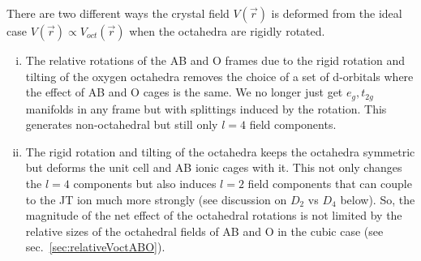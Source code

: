 \documentclass[a4paper,prb]{revtex4-1}  %
\newcommand{\com}[1]{}
\newcommand{\az}[1]{{\color{magenta}{#1}}} %
\begin{document}
\com{Before we present calculations and results, let's briefly
summarise the contribution of the AB cages towards the crystal field Hamiltonian
....}
 
There are two different ways the crystal field $V(\vec r)$
\az{[at the location of a B ion... which B ion out of four in distorted structure?... pick one here...]}
 is deformed from the ideal case $V(\vec r) \propto V_{oct}(\vec r)$
 when the octahedra are rigidly rotated. 
\begin{enumerate}[(i)]
\item
The relative rotations of the AB and O frames due to
the rigid rotation and tilting of the oxygen octahedra removes the
choice of a set of d-orbitals where the effect of 
AB and O cages is the same. 
We no longer just get $e_g, t_{2g}$ manifolds in any frame but with splittings induced by the rotation.
This generates non-octahedral but still only $l=4$ field components. 
\item
The rigid rotation and tilting of the octahedra keeps the octahedra symmetric but deforms the unit cell and AB ionic cages with it.
This not only changes the $l=4$ components but also induces 
$l=2$ field components
that can couple to the JT ion much more strongly (see discussion on $D_2$ vs $D_4$ below).
So, the magnitude of the net effect of the octahedral rotations is not limited by the relative sizes of the octahedral fields of AB and O in the cubic case (see sec.~\ref{sec:relativeVoctABO}).
\end{enumerate}




\com{
There are two different ways the crystal field $V(\vec r)$
 is deformed from the ideal case, $V_{voct}(\vec r)$.
\begin{enumerate}
\item The relative rotations of the AB and O frames due to
the rigid rotation and tilting of the oxygen octahedra removes the
choice of a set of d-orbitals where the effect of 
AB and O cages is the same. 
We no longer just get eg-t2g in any frame but with splittings induced by the rotation.
This can generate non-octahedral but still $l=4$ field components. 
\item
The rigid rotation and tilting of the octahedra keeps the octahedra symmetric but deforms the unit cell and AB ionic cages with it.
This not only changes the $l=4$ components but also induces 
$l=2$ field components
that can couple to the JT ion much more strongly (see discussion on $D_2$ vs $D_4$ below).
So, the magnitude of the net effect of the octahedral rotations is not limited by the relative sizes of the octahedral fields of AB and O in the cubic case (see sec.~\ref{sec:relativeVoctABO}).
\end{enumerate}

}
\end{document}
